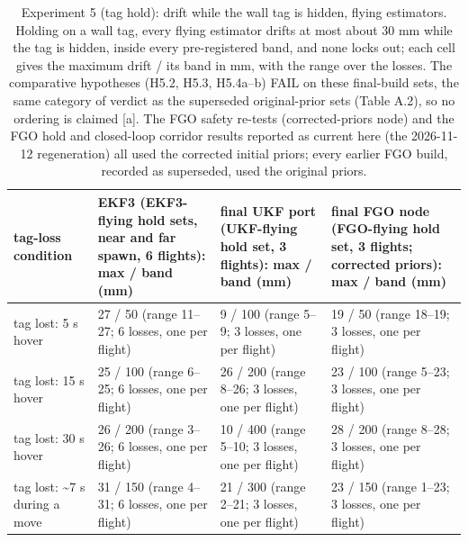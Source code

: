 \begin{table}[htbp]
\centering
\footnotesize
\caption{Experiment 5 (tag hold): drift while the wall tag is hidden, flying estimators. Holding on a wall tag, every flying estimator drifts at most about 30 mm while the tag is hidden, inside every pre-registered band, and none locks out; each cell gives the maximum drift / its band in mm, with the range over the losses. The comparative hypotheses (H5.2, H5.3, H5.4a--b) FAIL on these final-build sets, the same category of verdict as the superseded original-prior sets (Table A.2), so no ordering is claimed [a]. The FGO safety re-tests (corrected-priors node) and the FGO hold and closed-loop corridor results reported as current here (the 2026-11-12 regeneration) all used the corrected initial priors; every earlier FGO build, recorded as superseded, used the original priors.}
\label{tab:T5}
\begin{tabular}{p{}p{}p{}p{}}
\toprule
\textbf{tag-loss condition} & \textbf{EKF3 (EKF3-flying hold sets, near and far spawn, 6 flights): max / band (mm)} & \textbf{final UKF port (UKF-flying hold set, 3 flights): max / band (mm)} & \textbf{final FGO node (FGO-flying hold set, 3 flights; corrected priors): max / band (mm)} \\
\midrule
tag lost: 5 s hover & 27 / 50 (range 11--27; 6 losses, one per flight) & 9 / 100 (range 5--9; 3 losses, one per flight) & 19 / 50 (range 18--19; 3 losses, one per flight) \\
tag lost: 15 s hover & 25 / 100 (range 6--25; 6 losses, one per flight) & 26 / 200 (range 8--26; 3 losses, one per flight) & 23 / 100 (range 5--23; 3 losses, one per flight) \\
tag lost: 30 s hover & 26 / 200 (range 3--26; 6 losses, one per flight) & 10 / 400 (range 5--10; 3 losses, one per flight) & 28 / 200 (range 8--28; 3 losses, one per flight) \\
tag lost: \textasciitilde{}7 s during a move & 31 / 150 (range 4--31; 6 losses, one per flight) & 21 / 300 (range 2--21; 3 losses, one per flight) & 23 / 150 (range 1--23; 3 losses, one per flight) \\

\end{tabular}
\end{table}
